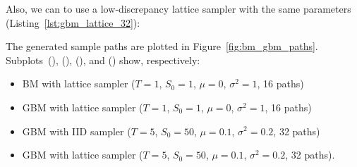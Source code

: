 

Also, we can to use a low‐discrepancy lattice sampler with the same parameters
(Listing~\ref{lst:gbm_lattice_32}): 

The generated sample paths are plotted in Figure~\ref{fig:bm_gbm_paths}.
Subplots~(), (),
(), and () show, respectively: 

\begin{itemize}
    \item BM with lattice sampler ($T=1$, $S_0=1$, $\mu=0$, $\sigma^2=1$, 16
    paths)
    \item GBM with lattice sampler ($T=1$, $S_0=1$, $\mu=0$, $\sigma^2=1$, 16
    paths)
    \item GBM with IID sampler ($T=5$, $S_0=50$, $\mu=0.1$, $\sigma^2=0.2$, 32
    paths)
    \item GBM with lattice sampler ($T=5$, $S_0=50$, $\mu=0.1$, $\sigma^2=0.2$,
    32 paths).
\end{itemize}

